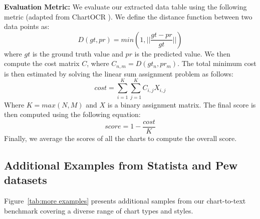 \textbf{Evaluation Metric:} We evaluate our extracted data table using the following metric (adapted from ChartOCR \cite{ChartOCR}).
We define the distance function between two data points as:
\[
D(gt, pr) = min(1, ||\frac{gt - pr}{gt}||)
\]
where $gt$ is the ground truth value and $pr$ is the predicted value. We then compute the cost matrix $C$, where $C_{n,m} = D(gt_n, pr_m)$. The total minimum cost is then estimated by solving the linear sum assignment problem as follows:
\[
cost = \sum_{i=1}^{K}{\sum_{j=1}^{K}{C_{i, j} X_{i,j}}}
\]
Where $K = max(N, M)$ and $X$ is a binary assignment matrix. The final score is then computed using the following equation:
\[
score = 1 - \frac{cost}{K}
\]
Finally, we average the scores of all the charts to compute the overall score. 












\subsection{Additional Examples from Statista and Pew datasets}
Figure~\ref{tab:more examples} presents additional samples from our chart-to-text benchmark covering a diverse range of chart types and styles.



